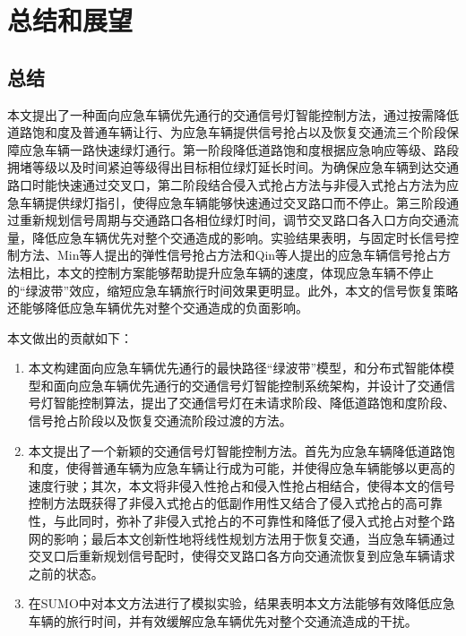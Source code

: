 \chapter{总结和展望}

\section{总结}
本文提出了一种面向应急车辆优先通行的交通信号灯智能控制方法，通过按需降低道路饱和度及普通车辆让行、为应急车辆提供信号抢占以及恢复交通流三个阶段保障应急车辆一路快速绿灯通行。第一阶段降低道路饱和度根据应急响应等级、路段拥堵等级以及时间紧迫等级得出目标相位绿灯延长时间。为确保应急车辆到达交通路口时能快速通过交叉口，第二阶段结合侵入式抢占方法与非侵入式抢占方法为应急车辆提供绿灯指引，使得应急车辆能够快速通过交叉路口而不停止。第三阶段通过重新规划信号周期与交通路口各相位绿灯时间，调节交叉路口各入口方向交通流量，降低应急车辆优先对整个交通造成的影响。实验结果表明，与固定时长信号控制方法、Min等人\cite{min}提出的弹性信号抢占方法和Qin等人\cite{qin_control_2012}提出的应急车辆信号抢占方法相比，本文的控制方案能够帮助提升应急车辆的速度，体现应急车辆不停止的“绿波带”效应，缩短应急车辆旅行时间效果更明显。此外，本文的信号恢复策略还能够降低应急车辆优先对整个交通造成的负面影响。

本文做出的贡献如下：
\begin{enumerate}
	\item 本文构建面向应急车辆优先通行的最快路径“绿波带”模型，和分布式智能体模型和面向应急车辆优先通行的交通信号灯智能控制系统架构，并设计了交通信号灯智能控制算法，提出了交通信号灯在未请求阶段、降低道路饱和度阶段、信号抢占阶段以及恢复交通流阶段过渡的方法。
	\item 本文提出了一个新颖的交通信号灯智能控制方法。首先为应急车辆降低道路饱和度，使得普通车辆为应急车辆让行成为可能，并使得应急车辆能够以更高的速度行驶；其次，本文将非侵入性抢占和侵入性抢占相结合，使得本文的信号控制方法既获得了非侵入式抢占的低副作用性又结合了侵入式抢占的高可靠性，与此同时，弥补了非侵入式抢占的不可靠性和降低了侵入式抢占对整个路网的影响；最后本文创新性地将线性规划方法用于恢复交通，当应急车辆通过交叉口后重新规划信号配时，使得交叉路口各方向交通流恢复到应急车辆请求之前的状态。
	\item 在SUMO中对本文方法进行了模拟实验，结果表明本文方法能够有效降低应急车辆的旅行时间，并有效缓解应急车辆优先对整个交通流造成的干扰。
\end{enumerate}

